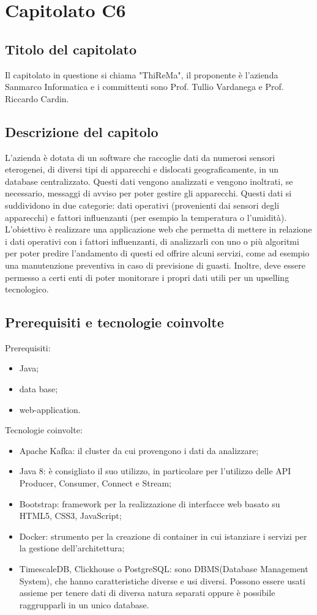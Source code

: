 \section{Capitolato C6}
\subsection{Titolo del capitolato}
Il capitolato in questione si chiama "ThiReMa", il proponente \`e l'azienda Sanmarco Informatica e i committenti sono Prof. Tullio Vardanega e Prof. Riccardo Cardin.

\subsection{Descrizione del capitolo}
L'azienda \`e dotata di un software che raccoglie dati da numerosi sensori eterogenei, di diversi tipi di apparecchi e dislocati geograficamente, in un database centralizzato. Questi dati vengono analizzati e vengono inoltrati, se necessario, messaggi di avviso per poter gestire gli apparecchi. Questi dati si suddividono in due categorie: dati operativi (provenienti dai sensori degli apparecchi) e fattori influenzanti (per esempio la temperatura o l'umidit\`a).
L'obiettivo \`e realizzare una applicazione web che permetta di mettere in relazione i dati operativi con i fattori influenzanti, di analizzarli con uno o pi\`u algoritmi per poter predire l'andamento di questi ed offrire alcuni servizi, come ad esempio una manutenzione preventiva in caso di previsione di guasti. Inoltre, deve essere permesso a certi enti di poter monitorare i propri dati utili per un upselling tecnologico.


\subsection{Prerequisiti e tecnologie coinvolte}
Prerequisiti:
\begin{itemize}
\item Java;	
\item data base;
\item web-application.
\end{itemize}
Tecnologie coinvolte:
\begin{itemize}
\item Apache Kafka: il cluster da cui provengono i dati da analizzare;
\item Java 8: \`e consigliato il suo utilizzo, in particolare per l'utilizzo delle API Producer, Consumer, Connect e Stream;
\item Bootstrap: framework per la realizzazione di interfacce web basato su HTML5, CSS3, JavaScript;
\item Docker: strumento per la creazione di container in cui istanziare i servizi per la gestione dell'architettura;
\item TimescaleDB, Clickhouse o PostgreSQL: sono DBMS(Database Management System), che hanno caratteristiche diverse e usi diversi. Possono essere usati assieme per tenere dati di diversa natura separati oppure \`e possibile raggrupparli in un unico database.
\end{itemize}

